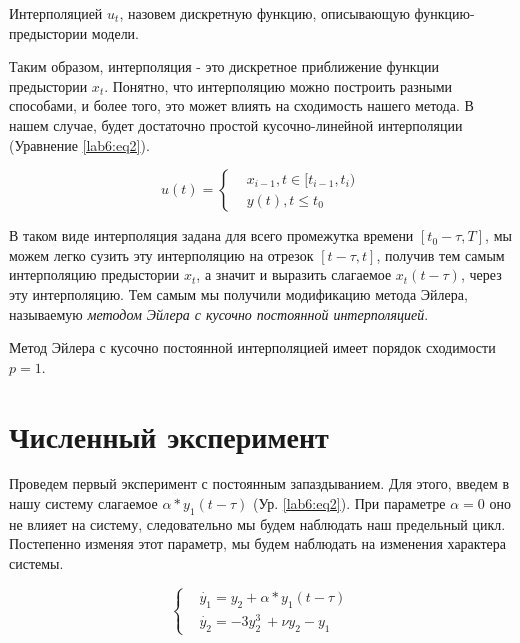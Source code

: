 \begin{definition}
    Интерполяцией $u_t$, назовем дискретную функцию,
    описывающую функцию-предыстории модели.
\end{definition}

Таким образом, интерполяция - это дискретное приближение
функции предыстории $x_t$. Понятно, что интерполяцию можно
построить разными способами, и более того, это может влиять
на сходимость нашего метода. В нашем случае, будет достаточно
простой кусочно-линейной интерполяции (Уравнение \eqref{lab6:eq2}).

\begin{equation}\label{lab6:eq2}
    u(t) = \begin{cases}
        &x_{i-1}, t \in [t_{i-1}, t_i) \\
        &y(t), t \leq t_0
    \end{cases}
\end{equation}

В таком виде интерполяция задана для всего промежутка времени
$[t_0-\tau, T]$, мы можем легко сузить
эту интерполяцию на отрезок $[t-\tau, t]$, получив тем самым
интерполяцию предыстории $x_t$, а значит и выразить
слагаемое $x_t(t - \tau)$, через эту интерполяцию.
Тем самым мы получили модификацию метода Эйлера, называемую
\textit{методом Эйлера с кусочно постоянной интерполяцией}.

\begin{theorem}
    Метод Эйлера с кусочно постоянной интерполяцией имеет порядок
    сходимости $p = 1$.
\end{theorem}



\section{Численный эксперимент}

Проведем первый эксперимент с постоянным запаздыванием.
Для этого, введем в нашу систему слагаемое
$\alpha * y_1(t-\tau)$ (Ур. \eqref{lab6:eq2}). При параметре
$\alpha = 0$ оно не влияет на систему, следовательно мы будем
наблюдать наш предельный цикл. Постепенно изменяя этот параметр,
мы будем наблюдать на изменения характера системы.

\begin{equation}\label{lab6:eq3}
\begin{cases}
    &\dot{y_1} = y_2 + \alpha * y_1(t-\tau)\\
    &\dot{y_2} = -3y_2^3\ + \nu y_2 - y_1
\end{cases}
\end{equation}


